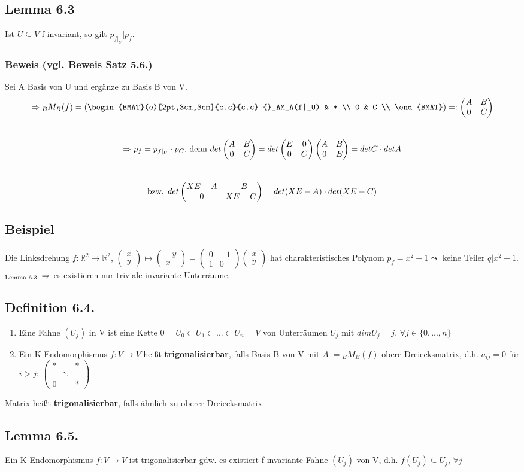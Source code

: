 \documentclass[a4paper, 12pt]{extarticle}
\newcommand{\twoXtwo}[4] {
	\left( 
	\begin{matrix}
		#1 & #2 \\
		#3 & #4
	\end{matrix} 
	\right)
}
\newcommand{\threeXthree}[9] {
	\left( 
	\begin{matrix}
		#1 & #2 & #3\\
		#4 & #5 & #6\\
		#7 & #8 & #9
	\end{matrix}
	\right)
}
\newcommand{\vecTwo}[2] {
	\left( 
	\begin{matrix}
		#1\\
		#2
	\end{matrix} 
	\right)
}
\newcommand{\tn}[1]{\textnormal {#1}}
\begin{document}
\subsection*{Lemma 6.3}
Ist $U\subseteq V$ f-invariant, so gilt $p_{f|_U} | p_f$.
\subsubsection*{Beweis (vgl. Beweis Satz 5.6.)}
Sei A Basis von U und ergänze zu Basis B von V.
$$\Rightarrow {}_BM_B(f) = 
\left(
\begin{BMAT}(e)[2pt,3cm,3cm]{c.c}{c.c}
	{}_AM_A(f|_U) & * \\
	0 & C  \\
\end{BMAT}
\right) =: \twoXtwo	{A}{B}
					{0}{C}$$ \\
$$\Rightarrow p_f = p_{f|_U} \cdot p_C\tn{, denn }det\twoXtwo	{A}{B}{0}{C} = det\twoXtwo{E}{0}{0}{C}\twoXtwo{A}{B}{0}{E} = detC \cdot detA$$\\
$$\tn{bzw. } det \twoXtwo{XE-A}{-B}{0}{XE-C} = det(XE-A)\cdot det(XE-C)$$
\subsection*{Beispiel}
Die Linksdrehung $f:\mathbb R^2 \to \mathbb R^2$, $\vecTwo{x}{y} \mapsto \vecTwo{-y}{x} = \twoXtwo{0}{-1}{1}{0}\vecTwo{x}{y}$ hat charakteristisches Polynom $p_f = x^2+1 \leadsto$ keine Teiler $q|x^2+1$.\\
$_{\tn{Lemma 6.3.}}\Rightarrow$ es existieren nur triviale invariante Unterräume.
\subsection*{Definition 6.4.}
\begin{enumerate}[label=(\alph*)]
	\item Eine Fahne $(U_j)$ in V ist eine Kette $0 = U_0 \subset U_1 \subset ... \subset U_n = V$ von Unterräumen $U_j$ mit $dim U_j = j$, $\forall j\in \{0,..., n\}$
	\item Ein K-Endomorphismus $f:V\to V$ heißt \textbf{trigonalisierbar}, falls Basis B von V mit $A:= {}_BM_B(f)$ obere Dreiecksmatrix, d.h. $a_{ij}=0$ für $i>j$: $\threeXthree	{*}{ }{*}
																	{ }{\ddots}{ }
																	{0}{ }{*}$
\end{enumerate}										
Matrix heißt \textbf{trigonalisierbar}, falls ähnlich zu oberer Dreiecksmatrix.
\subsection*{Lemma 6.5.}
Ein K-Endomorphismus $f:V\to V$ ist trigonalisierbar gdw. es existiert f-invariante Fahne $(U_j)$ von V, d.h. $f(U_j)\subseteq U_j$, $\forall j$
\end{document}
